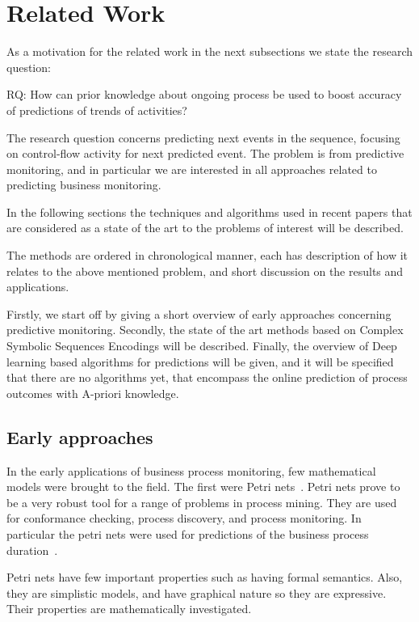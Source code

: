 \section{Related Work} %
\label{sec:related_work}

As a motivation for the related work in the next subsections we state the research question:

RQ: How can prior knowledge about ongoing process be used to boost accuracy of predictions of trends of activities?

The research question concerns predicting next events in the sequence, focusing on control-flow activity for next predicted event. The problem is from predictive monitoring, and in particular we are interested in all approaches related to predicting business monitoring. 

In the following sections the techniques and algorithms used in recent papers that are considered as a state of the art to the problems of interest will be described.

The methods are ordered in chronological manner, each has description of how it relates to the above mentioned problem, and short discussion on the results and applications.

Firstly, we start off by giving a short overview of early approaches concerning predictive monitoring.
Secondly, the state of the art methods based on Complex Symbolic Sequences Encodings will be described. 
Finally, the overview of Deep learning based algorithms for predictions will be given, and it will be specified that there are no algorithms yet, that encompass the online prediction of process outcomes with A-priori knowledge.



\subsection{Early approaches}

In the early applications of business process monitoring, few mathematical models were brought to the field. The first were Petri nets~\cite{doi:10.1142/S0218126698000043}. Petri nets prove to be a very robust tool for a range of problems in process mining. They are used for conformance checking, process discovery, and process monitoring. In particular the petri nets were used for predictions of the business process duration~\cite{Rogge-Solti2015PBP}. 

Petri nets have few important properties such as having formal semantics. Also, they are simplistic models, and have graphical nature so they are expressive. Their properties are mathematically investigated. 

